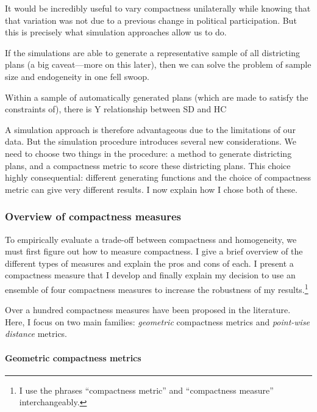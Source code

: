\documentclass[]{article}
\let\oldparagraph\paragraph
\renewcommand{\paragraph}[1]{\oldparagraph{#1}\mbox{}}
\begin{document}
It would be incredibly useful to vary compactness unilaterally while
knowing that that variation was not due to a previous change in
political participation. But this is precisely what simulation
approaches allow us to do.

If the simulations are able to generate a representative sample of all
districting plans (a big caveat---more on this later), then we can solve
the problem of sample size and endogeneity in one fell swoop.

Within a sample of automatically generated plans (which are made to
satisfy the constraints of), there is Y relationship between SD and HC

A simulation approach is therefore advantageous due to the limitations
of our data. But the simulation procedure introduces several new
considerations. We need to choose two things in the procedure: a method
to generate districting plans, and a compactness metric to score these
districting plans. This choice highly consequential: different
generating functions and the choice of compactness metric can give very
different results. I now explain how I chose both of these.

\hypertarget{overview-of-compactness-measures}{%
\subsubsection{Overview of compactness
measures}\label{overview-of-compactness-measures}}

To empirically evaluate a trade-off between compactness and homogeneity,
we must first figure out how to measure compactness. I give a brief
overview of the different types of measures and explain the pros and
cons of each. I present a compactness measure that I develop and finally
explain my decision to use an ensemble of four compactness measures to
increase the robustness of my results.\footnote{I use the phrases
  ``compactness metric'' and ``compactness measure'' interchangeably.}

Over a hundred compactness measures have been proposed in the
literature. Here, I focus on two main families: \emph{geometric}
compactness metrics and \emph{point-wise distance} metrics.

\hypertarget{geometric-compactness-metrics}{%
\paragraph{Geometric compactness
metrics}\label{geometric-compactness-metrics}}
\end{document}
